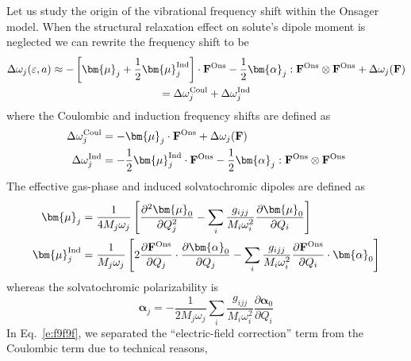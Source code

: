 \documentclass[b5paper,oneside,fleqn,11pt]{book}
\newcommand{\BM}[1]{\bm{#1}}
\newcommand{\fderiv}[2]{\ensuremath{
    \frac{\partial #1}{\partial #2}}}
\newcommand{\sderiv}[2]{\ensuremath{
    \frac{\partial^2 #1}{\partial #2^2}
    }}
\begin{document}
\begin{refsection}
Let us study the origin of the vibrational frequency shift
within the Onsager model. 
When the structural relaxation effect on solute's dipole moment
is neglected we can rewrite the frequency shift to be
%
\begin{multline} \label{e:f9f9f}
 \Delta\omega_j(\varepsilon, a) \approx 
- \left[ {\BM \mu}_j + \frac{1}{2} {\BM \mu}_j^{\rm Ind} \right] \cdot {\bf F}^{\rm Ons} 
- \frac{1}{2} {\BM \alpha}_j : {\bf F}^{\rm Ons} \otimes {\bf F}^{\rm Ons} 
+ \Delta\omega_j({\bf F})
\\ = \Delta\omega_j^{\rm Coul} + \Delta\omega_j^{\rm Ind}
\end{multline}
%
where the Coulombic and induction frequency shifts 
are defined as
%
\begin{subequations}
 \begin{align}
   \Delta\omega_j^{\rm Coul}             &= - {\BM \mu}_j \cdot {\bf F}^{\rm Ons} + \Delta\omega_j({\bf F})\\
   \Delta\omega_j^{\rm Ind}              &= - \frac{1}{2} {\BM \mu}_j^{\rm Ind} \cdot {\bf F}^{\rm Ons} 
       - \frac{1}{2} {\BM \alpha}_j : {\bf F}^{\rm Ons} \otimes {\bf F}^{\rm Ons} 
 \end{align}
\end{subequations}
%
The effective gas\hyp{}phase and induced solvatochromic dipoles
are defined as
%
\begin{subequations}
 \begin{align}
   {\BM \mu}_j &= \frac{1}{4M_j\omega_j}
\left[  \sderiv{{\BM\mu}_0}{Q_j}
- \sum_i \frac{g_{ijj}}{M_i\omega_i^2} \fderiv{{\BM\mu}_0}{Q_i}
\right] \\
   {\BM \mu}_j^{\rm Ind} &= \frac{1}{M_j\omega_j} 
\left[ 2 \fderiv{{\bf F}^{\rm Ons}}{Q_j} \cdot \fderiv{{\BM\alpha}_0}{Q_j} - 
   \sum_i \frac{g_{ijj}}{M_i\omega_i^2} \fderiv{{\bf F}^{\rm Ons}}{Q_i} \cdot {\BM\alpha}_0
\right]
 \end{align}
\end{subequations}
%
whereas the solvatochromic polarizability is
%
\begin{equation} 
  {\BM \alpha}_j = - \frac{1}{2M_j\omega_j} 
   \sum_i \frac{g_{ijj}}{M_i\omega_i^2} \fderiv{{\BM\alpha}_0}{Q_i}
\end{equation}
%
In Eq.~\eqref{e:f9f9f}, we separated the ``electric\hyp{}field correction''
term from the Coulombic term due to technical reasons,

\end{refsection}
\end{document}
